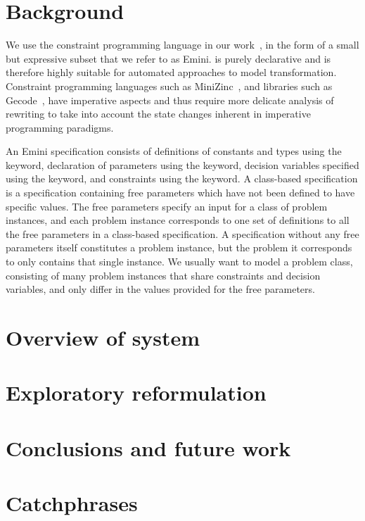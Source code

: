 \section{Background}

We use the \essence constraint programming language in our work~\cite{frisch2008:essence}, in the form of a small but expressive subset that we refer to as Emini.
\essence is purely declarative and is therefore highly suitable for automated approaches to model transformation.
Constraint programming languages such as MiniZinc~\cite{nethercote2007:minizinc}, and libraries such as Gecode~\cite{gecode}, have imperative aspects and thus require more delicate analysis of rewriting to take into account the state changes inherent in imperative programming paradigms. 

An Emini specification consists of definitions of constants and types using the  keyword, declaration of parameters using the  keyword, decision variables specified using the  keyword, and constraints using the  keyword.
A class-based specification is a specification containing free parameters which have not been defined to have specific values.
The free parameters specify an input for a class of problem instances, and each problem instance corresponds to one set of definitions to all the free parameters in a class-based specification.
A specification without any free parameters itself constitutes a problem instance, but the problem it corresponds to only contains that single instance.
We usually want to model a problem class, consisting of many problem instances that share constraints and decision variables, and only differ in the values provided for the free parameters.


\section{Overview of system}

\section{Exploratory reformulation}

\section{Conclusions and future work}

\section{Catchphrases}

